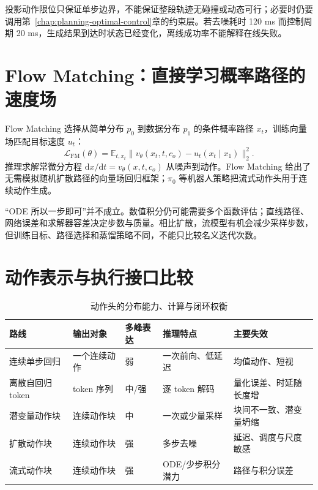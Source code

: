 投影动作限位只保证单步边界，不能保证整段轨迹无碰撞或动态可行；必要时仍要调用第~\ref{chap:planning-optimal-control}章的约束层。若去噪耗时 120 ms 而控制周期 20 ms，生成结果到达时状态已经变化，离线成功率不能解释在线失败。

\section{Flow Matching：直接学习概率路径的速度场}

Flow Matching 选择从简单分布 $p_0$ 到数据分布 $p_1$ 的条件概率路径 $x_t$，训练向量场匹配目标速度 $u_t$：
\begin{equation}
\mathcal L_{\mathrm{FM}}(\theta)
=\mathbb E_{t,x_t}\|v_\theta(x_t,t,c_o)-u_t(x_t\mid x_1)\|_2^2.
\label{eq:flow-matching}
\end{equation}
推理求解常微分方程 $\mathrm d x/\mathrm dt=v_\theta(x,t,c_o)$ 从噪声到动作。Flow Matching 给出了无需模拟随机扩散路径的向量场回归框架\cite{lipman2023flowmatching}；$\pi_0$ 等机器人策略把流式动作头用于连续动作生成\cite{black2024pi0}。

“ODE 所以一步即可”并不成立。数值积分仍可能需要多个函数评估；直线路径、网络误差和求解器容差决定步数与质量。相比扩散，流模型有机会减少采样步数，但训练目标、路径选择和蒸馏策略不同，不能只比较名义迭代次数。

\section{动作表示与执行接口比较}

\begin{table}[H]
\centering
\caption{动作头的分布能力、计算与闭环权衡}
\label{tab:generative-action-comparison}
\begin{tabularx}{\textwidth}{>{\raggedright\arraybackslash}p{}YYYY}
\toprule
路线 & 输出对象 & 多峰表达 & 推理特点 & 主要失效 \\
\midrule
连续单步回归 & 一个连续动作 & 弱 & 一次前向、低延迟 & 均值动作、短视 \\
离散自回归 token & token 序列 & 中/强 & 逐 token 解码 & 量化误差、时延随长度增 \\
潜变量动作块 & 连续动作块 & 中 & 一次或少量采样 & 块间不一致、潜变量坍缩 \\
扩散动作块 & 连续动作块 & 强 & 多步去噪 & 延迟、调度与尺度敏感 \\
流式动作块 & 连续动作块 & 强 & ODE/少步积分潜力 & 路径与积分误差 \\
\bottomrule
\end{tabularx}
\end{table}

